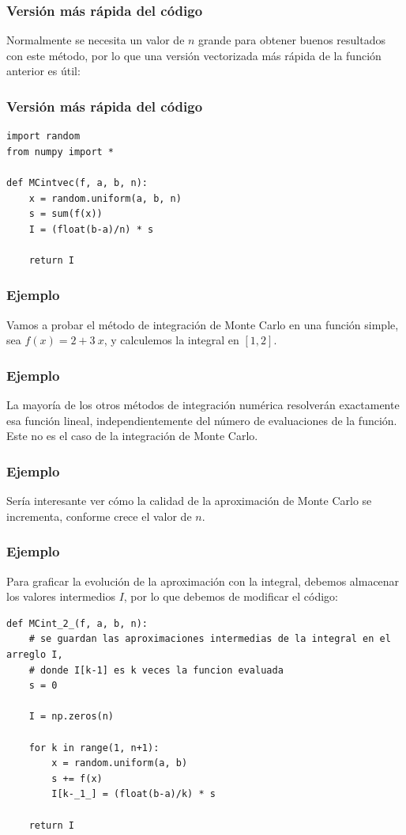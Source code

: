 \documentclass[12pt]{beamer}
\begin{document}
\begin{frame}[fragile]
\frametitle{Versión más rápida del código}
Normalmente se necesita un valor de $n$ grande para obtener buenos resultados con este método, por lo que una versión vectorizada más rápida de la función anterior es útil:
\end{frame}
\begin{frame}
\frametitle{Versión más rápida del código}
\begin{lstlisting}[caption=Función vectorizada para la aproximación de la integral, style=FormattedNumber, basicstyle=\linespread{1.1}\ttfamily=\small, columns=fullflexible]
import random
from numpy import *

def MCintvec(f, a, b, n):
    x = random.uniform(a, b, n)
    s = sum(f(x))
    I = (float(b-a)/n) * s

    return I
\end{lstlisting}
\end{frame}
\begin{frame}
\frametitle{Ejemplo}
Vamos a probar el método de integración de Monte Carlo en una función simple, sea $f(x) = 2 + 3 \: x$, y calculemos la integral en $[1, 2]$.
\end{frame}
\begin{frame}
\frametitle{Ejemplo}
La mayoría de los otros métodos de integración numérica resolverán exactamente esa función lineal, independientemente del número de evaluaciones de la función.
\\
\bigskip
\pause
Este no es el caso de la integración de Monte Carlo. 
\end{frame}
\begin{frame}
\frametitle{Ejemplo}
Sería interesante ver cómo la calidad de la aproximación de Monte Carlo se incrementa, conforme crece el valor de $n$.
\end{frame}
\begin{frame}
\frametitle{Ejemplo}
Para graficar la evolución de la aproximación con la integral, debemos almacenar los valores intermedios $I$, por lo que debemos de modificar el código:
\end{frame}
\begin{frame}
\begin{lstlisting}[caption=Código para el ejercicio, style=FormattedNumber, basicstyle=\linespread{1.1}\ttfamily=\small, columns=fullflexible]
def MCint_2_(f, a, b, n):
    # se guardan las aproximaciones intermedias de la integral en el arreglo I,
    # donde I[k-1] es k veces la funcion evaluada
    s = 0

    I = np.zeros(n)

    for k in range(1, n+1):
        x = random.uniform(a, b)
        s += f(x)
        I[k-_1_] = (float(b-a)/k) * s
    
    return I
\end{lstlisting}
\end{frame}
\end{document}

